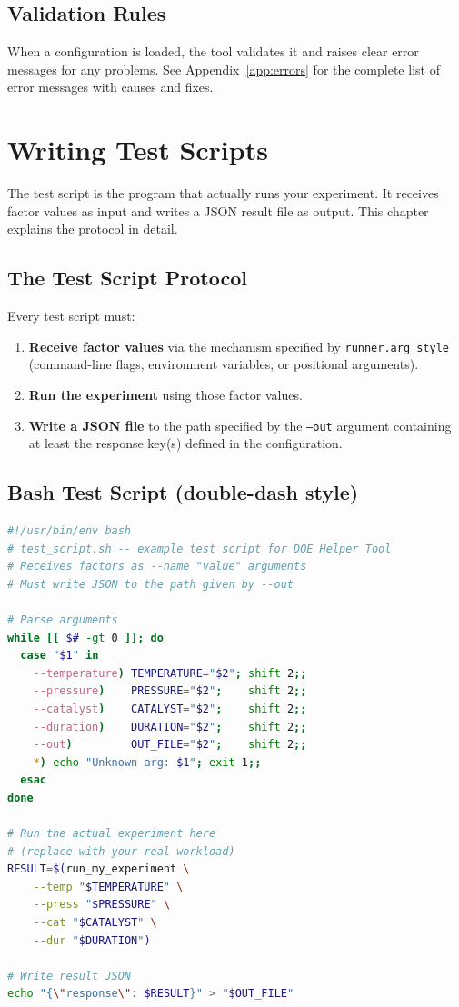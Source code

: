 \documentclass[11pt]{book}
\begin{document}
\section{Validation Rules}

When a configuration is loaded, the tool validates it and raises clear error messages for any problems. See Appendix~\ref{app:errors} for the complete list of error messages with causes and fixes.


\chapter{Writing Test Scripts}
\label{ch:testscripts}

The test script is the program that actually runs your experiment. It receives factor values as input and writes a JSON result file as output. This chapter explains the protocol in detail.

\section{The Test Script Protocol}

Every test script must:

\begin{enumerate}
  \item \textbf{Receive factor values} via the mechanism specified by \texttt{runner.arg\_style} (command-line flags, environment variables, or positional arguments).
  \item \textbf{Run the experiment} using those factor values.
  \item \textbf{Write a JSON file} to the path specified by the \texttt{--out} argument containing at least the response key(s) defined in the configuration.
\end{enumerate}

\section{Bash Test Script (double-dash style)}

\begin{lstlisting}[language=bash]
#!/usr/bin/env bash
# test_script.sh -- example test script for DOE Helper Tool
# Receives factors as --name "value" arguments
# Must write JSON to the path given by --out

# Parse arguments
while [[ $# -gt 0 ]]; do
  case "$1" in
    --temperature) TEMPERATURE="$2"; shift 2;;
    --pressure)    PRESSURE="$2";    shift 2;;
    --catalyst)    CATALYST="$2";    shift 2;;
    --duration)    DURATION="$2";    shift 2;;
    --out)         OUT_FILE="$2";    shift 2;;
    *) echo "Unknown arg: $1"; exit 1;;
  esac
done

# Run the actual experiment here
# (replace with your real workload)
RESULT=$(run_my_experiment \
    --temp "$TEMPERATURE" \
    --press "$PRESSURE" \
    --cat "$CATALYST" \
    --dur "$DURATION")

# Write result JSON
echo "{\"response\": $RESULT}" > "$OUT_FILE"
\end{lstlisting}
\end{document}
